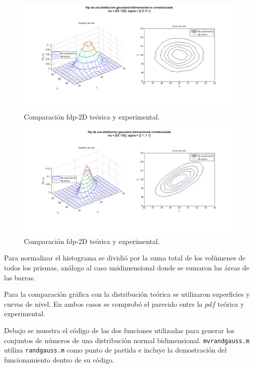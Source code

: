 \documentclass[11pt,a4paper,final]{article}
\begin{document}
\begin{figure}
	\centering
	\includegraphics[width=\textwidth]{Ejercicio1_02.png}
	\caption{Comparación fdp-2D teórica y experimental.}
	\label{ejercicio12}
\end{figure}
\begin{figure}
	\centering
	\includegraphics[width=\textwidth]{Ejercicio1_03.png}
	\caption{Comparación fdp-2D teórica y experimental.}
	\label{ejercicio13}
\end{figure}

Para normalizar el histograma se dividió por la suma total de los volúmenes de todos los prismas, análogo al caso unidimensional donde se sumaron las áreas de las barras.


Para la comparación gráfica con la distribución teórica se utilizaron superficies y curvas de nivel. En ambos casos se comprobó el parecido entre la $pdf$ teórica y experimental.


Debajo se muestra el código de las dos funciones utilizadas para generar los conjuntos de números de una distribución normal bidimensional. \texttt{mvrandgauss.m} utiliza \texttt{randgauss.m} como punto de partida e incluye la demostración del funcionamiento dentro de su código.
\end{document}
